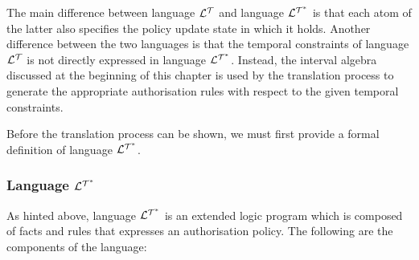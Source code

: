 \documentclass[11pt]{report}
\begin{document}
        The main difference between language ${\cal L^T}$ and language
        ${\cal L^{T^*}}$ is that each atom of the latter also specifies the
        policy update state in which it holds. Another difference between the
        two languages is that the temporal constraints of language ${\cal L^T}$
        is not directly expressed in language ${\cal L^{T^*}}$. Instead, the
        interval algebra discussed at the beginning of this chapter is used by
        the translation process to generate the appropriate authorisation rules
        with respect to the given temporal constraints.

        Before the translation process can be shown, we must first provide
        a formal definition of language ${\cal L^{T^*}}$.

        \subsubsection{Language ${\cal L^{T^*}}$}

          As hinted above, language ${\cal L^{T^*}}$ is an extended logic
          program which is composed of facts and rules that expresses an
          authorisation policy. The following are the components of the
          language:
\end{document}
